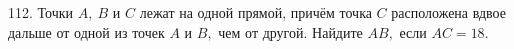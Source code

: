 112. Точки $A,\ B$ и $C$ лежат на одной прямой, причём точка $C$ расположена вдвое дальше от одной из точек $A$ и $B,$ чем от другой. Найдите $AB,$ если $AC=18.$\\

